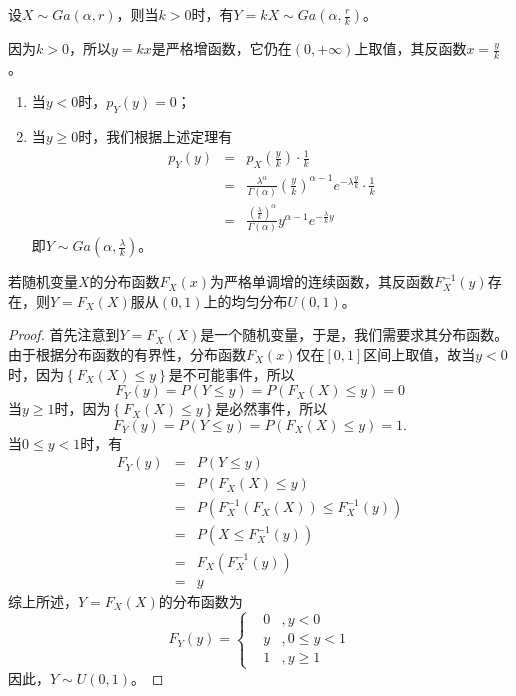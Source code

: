 \begin{example}
    设$X\sim Ga(\alpha,r)$，则当$k>0$时，有$Y=kX\sim Ga(\alpha,\frac{r}{k})$。
\end{example}
\begin{solution}
    因为$k>0$，所以$y=kx$是严格增函数，它仍在$(0,+\infty)$上取值，其反函数$x=\frac{y}{k}$。
    \begin{enumerate}
        \item 当$y<0$时，$p_{Y}(y)=0$；
        \item 当$y\ge0$时，我们根据上述定理有
    \begin{eqnarray*}
    p_{Y}(y)&=&p_{X}\left(\frac{y}{k}\right) \cdot \frac{1}{k} \\
    &=&\frac{\lambda^{\alpha}}{\Gamma(\alpha)}\left(\frac{y}{k}\right)^{\alpha-1} e^{-\lambda \frac{y}{k}} \cdot \frac{1}{k} \\
    &=&\frac{\left(\frac{\lambda}{k}\right)^{\alpha}}{\Gamma(\alpha)} y^{\alpha-1} e^{-\frac{\lambda}{k} y}
    \end{eqnarray*}
    即$Y\sim Ga(\alpha,\frac{\lambda}{k})$。
    \end{enumerate}
\end{solution}
\begin{corollary}
若随机变量$X$的分布函数$F_{X}(x)$为严格单调增的连续函数，其反函数$F_{X}^{-1}(y)$存在，则$Y=F_{X}(X)$服从$(0,1)$上的均匀分布$U(0,1)$。
\end{corollary}
\begin{proof}
    首先注意到$Y=F_{X}(X)$是一个随机变量，于是，我们需要求其分布函数。由于根据分布函数的有界性，分布函数$F_{X}(x)$仅在$[0,1]$区间上取值，故当$y<0$时，因为$\left \{ F_{X}(X)\leq y \right \} $是不可能事件，所以$$F_{Y}(y)=P(Y \leqslant y)=P\left(F_{X}(X) \leqslant y\right)=0$$
    当$y\geq 1$时，因为$\left \{ F_{X}(X)\le y \right \} $是必然事件，所以$$F_{Y}(y)=P(Y \leqslant y)=P\left(F_{X}(X) \leqslant y\right)=1.$$
    当$0\leq y<1$时，有
    \begin{eqnarray*}
           F_{Y}(y) &=&P(Y \leqslant y) \\
    &=&P\left(F_{X}(X) \leqslant y\right) \\
    &=&P\left(F_{X}^{-1}\left(F_{X}(X)\right) \leqslant F_{X}^{-1}(y)\right) \\
    &=&P\left(X \leqslant F_{X}^{-1}(y)\right) \\
    &=&F_{X}\left(F_{X}^{-1}(y)\right) \\
    &=&y
    \end{eqnarray*}
    综上所述，$Y=F_{X}(X)$的分布函数为$$F_{Y}(y)=\left\{
    \begin{aligned}
   & 0 &,y<0 \\
   & y &,0 \leq y<1 \\
   & 1 &,y \geqslant 1
    \end{aligned}\right.$$
    因此，$Y\sim U(0,1)$。
\end{proof}
